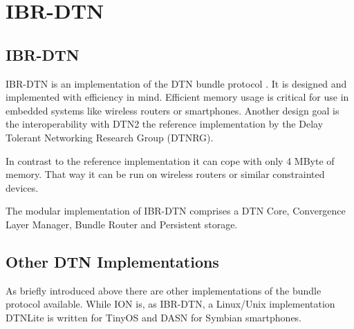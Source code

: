 \chapter{IBR-DTN}
\label{ibr-dtn}
\section{IBR-DTN}

IBR-DTN is an implementation of the DTN bundle protocol \cite{RFC5050}. It is designed and
implemented with efficiency in mind. Efficient memory usage is critical for
use in embedded systems like wireless routers or smartphones. Another design
goal is the interoperability with DTN2 the reference implementation by the Delay
Tolerant Networking Research Group (DTNRG).

In contrast to the reference implementation it can cope with only 4 MByte of
memory. That way it can be run on wireless routers or similar constrainted
devices.

The modular implementation of IBR-DTN comprises a DTN Core, Convergence Layer
Manager, Bundle Router and Persistent storage.

\section{Other DTN Implementations}

As briefly introduced above there are other implementations of the bundle
protocol available. While ION is, as IBR-DTN, a Linux/Unix implementation
DTNLite is written for TinyOS and DASN for Symbian smartphones.
